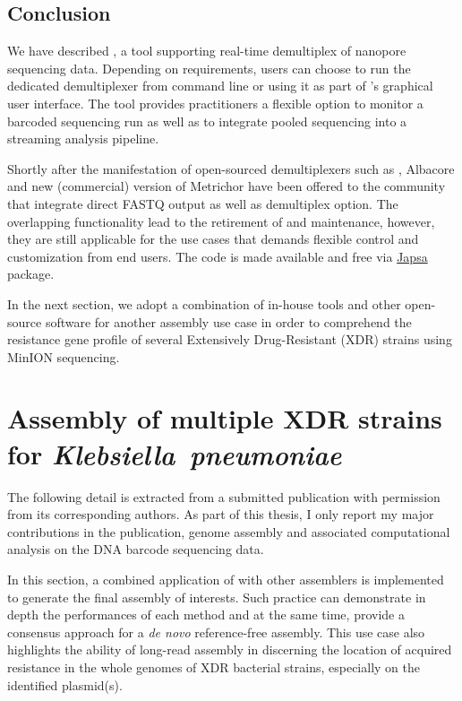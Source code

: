 \subsection{Conclusion}

We have described \npbarcode{}, a tool supporting real-time demultiplex of nanopore sequencing data. 
Depending on requirements, users can choose to run the dedicated demultiplexer from command line or using it as part of \npreader's graphical user interface. 
The tool provides practitioners a flexible option to monitor a barcoded sequencing run as well as to integrate pooled sequencing into a streaming analysis pipeline.

Shortly after the manifestation of open-sourced demultiplexers such as \npbarcode{}, Albacore and new (commercial) version of Metrichor have been offered to the community that integrate direct FASTQ output as well as demultiplex option. The overlapping functionality lead to the retirement of \npreader{} and \npbarcode{} maintenance, however, they are still applicable for the use cases that demands flexible control and customization from end users. The code is made available and free via \href{https://github.com/mdcao/japsa}{Japsa} package.  

In the next section, we adopt a combination of in-house tools and other open-source software for another assembly use case in order to comprehend the resistance gene profile of several Extensively Drug-Resistant (XDR) \kp{} strains using MinION sequencing.

\section{Assembly of multiple XDR strains for \emph{Klebsiella~pneumoniae}} 
The following detail is extracted from a submitted publication with permission from its corresponding authors.
As part of this thesis, I only report my major contributions in the publication, \IE{} genome assembly and associated computational analysis on the DNA barcode sequencing data. 

In this section, a combined application of \npscarf{} with other assemblers is implemented to generate the final assembly of interests. Such practice can demonstrate in depth the performances of each method and at the same time, provide a consensus approach for a \emph{de novo} reference-free assembly.
This use case also highlights the ability of long-read assembly in discerning the location of acquired resistance in the whole genomes of XDR bacterial strains, especially on the identified plasmid(s).
